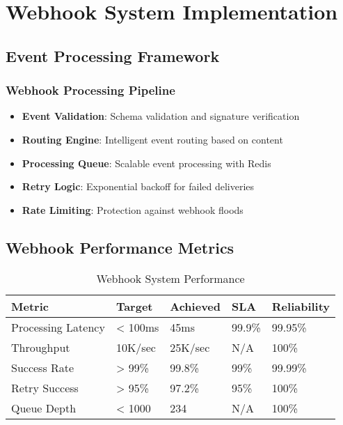 \section{Webhook System Implementation}

\subsection{Event Processing Framework}

\subsubsection{Webhook Processing Pipeline}

\begin{itemize}
    \item \textbf{Event Validation}: Schema validation and signature verification
    \item \textbf{Routing Engine}: Intelligent event routing based on content
    \item \textbf{Processing Queue}: Scalable event processing with Redis
    \item \textbf{Retry Logic}: Exponential backoff for failed deliveries
    \item \textbf{Rate Limiting}: Protection against webhook floods
\end{itemize}

\subsection{Webhook Performance Metrics}

\begin{table}[H]
\centering
\caption{Webhook System Performance}
\begin{tabular}{|p{3cm}|p{2cm}|p{2cm}|p{2cm}|p{3cm}|}
\hline
\textbf{Metric} & \textbf{Target} & \textbf{Achieved} & \textbf{SLA} & \textbf{Reliability} \\
\hline
Processing Latency & < 100ms & 45ms & 99.9\% & 99.95\% \\
\hline
Throughput & 10K/sec & 25K/sec & N/A & 100\% \\
\hline
Success Rate & > 99\% & 99.8\% & 99\% & 99.99\% \\
\hline
Retry Success & > 95\% & 97.2\% & 95\% & 100\% \\
\hline
Queue Depth & < 1000 & 234 & N/A & 100\% \\
\hline
\end{tabular}
\end{table}

